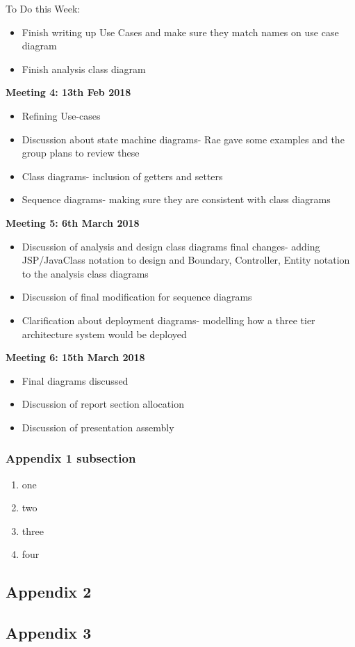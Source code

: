 To Do this Week:
\begin{itemize}
  \item Finish writing up Use Cases and make sure they match names on use case diagram
  \item Finish analysis class diagram

\end{itemize}

\textbf{Meeting 4: 13th Feb 2018}

\begin{itemize}
  \item Refining Use-cases
  \item Discussion about state machine diagrams- Rae gave some examples and the group plans to review these
  \item Class diagrams- inclusion of getters and setters
  \item Sequence diagrams- making sure they are consistent with class diagrams


\end{itemize}

\textbf{Meeting 5: 6th March 2018}

\begin{itemize}
	\item Discussion of analysis and design class diagrams final changes- adding JSP/JavaClass notation to design and Boundary, Controller, Entity notation to the analysis class diagrams
	\item Discussion of final modification for sequence diagrams
	\item Clarification about deployment diagrams- modelling how a three tier architecture system would be deployed

\end{itemize}

\textbf{Meeting 6: 15th March 2018}

\begin{itemize}
	\item Final diagrams discussed 
	\item Discussion of report section allocation
	\item Discussion of presentation assembly

\end{itemize}




\subsubsection{Appendix 1 subsection}

\begin{enumerate}

  \item one
  \item two
  \item three
  \item four

\end{enumerate}


\subsection{Appendix 2}

\subsection{Appendix 3}






